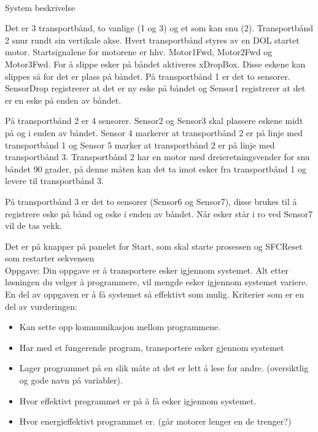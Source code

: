 

\\[0.2cm]
System beskrivelse

Det er 3 transportbånd, to vanlige (1 og 3) og et som kan snu (2). Transportbånd 2 snur rundt sin vertikale akse. Hvert transportbånd styres av en DOL startet motor. Startsignalene for motorene er hhv. Motor1Fwd, Motor2Fwd og Motor3Fwd. For å slippe esker på båndet aktiveres xDropBox. Disse eskene kan slippes så for det er plass på båndet. 
På transportbånd 1 er det to sensorer. SensorDrop registrerer at det er ny eske på båndet og Sensor1 registrerer at det er en eske på enden av båndet.
\vskip 2.5pt 
 
På transportbånd 2 er 4 sensorer. Sensor2 og Sensor3 skal plassere eskene midt på og i enden av båndet. Sensor 4 markerer at transportbånd 2 er på linje med transportbånd 1 og Sensor 5 marker at transportbånd 2 er på linje med transportbånd 3. Transportbånd 2 har en motor med dreieretningsvender for snu båndet 90 grader, på denne måten kan det ta imot esker fra transportbånd 1 og levere til transportbånd 3.
\vskip 2.5pt 
  
På transportbånd 3 er det to sensorer (Sensor6 og Sensor7), disse brukes til å registrere eske på bånd og eske i enden av båndet. Når esker står i ro ved Sensor7 vil de tas vekk. 
\vskip 2.5pt 

Det er på knapper på panelet for Start, som skal starte prosessen og SFCReset som restarter sekvensen \\

Oppgave:
Din oppgave er å transportere esker igjennom systemet. Alt etter løsningen du velger å programmere, vil mengde esker igjennom systemet variere. En del av oppgaven er å få systemet så effektivt som mulig. 
Kriterier som er en del av vurderingen:
\begin{itemize}[noitemsep]
	\item Kan sette opp kommunikasjon mellom programmene. 
	\item Har med et fungerende program, transportere esker gjennom systemet
	\item Lager programmet på en slik måte at det er lett å lese for andre. (oversiktlig og gode navn på variabler). 
	\item Hvor effektivt programmet er på å få esker igjennom systemet. 
	\item Hvor energieffektivt programmet er. (går motorer lenger en de trenger?)
\end{itemize}

